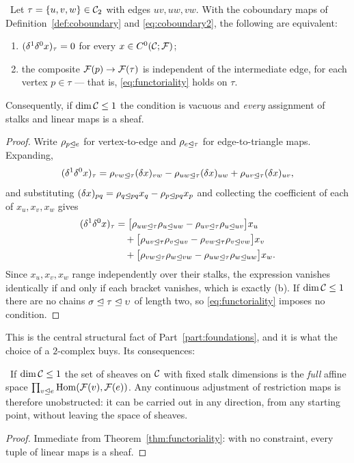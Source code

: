 \begin{theorem}[Functoriality on a triangle is exactly $\cob^1\cob^0=0$]
\label{thm:functoriality}
\Proved\ Let $\tau=\{u,v,w\}\in\mathcal{C}_2$ with edges $uv,uw,vw$. With the
coboundary maps of Definition~\ref{def:coboundary} and
\eqref{eq:coboundary2}, the following are equivalent:
\begin{enumerate}[label=(\alph*)]
  \item $(\delta^1\delta^0x)_\tau=0$ for every $x\in C^{0}(\mathcal{C};\mathcal{F})$;
  \item the composite $\mathcal{F}(p)\to\mathcal{F}(\tau)$ is independent of the
    intermediate edge, for each vertex $p\in\tau$ --- that is,
    \eqref{eq:functoriality} holds on $\tau$.
\end{enumerate}
Consequently, if $\dim\mathcal{C}\le1$ the condition is vacuous and \emph{every}
assignment of stalks and linear maps is a sheaf.
\end{theorem}
\begin{proof}
Write $\rho_{p\trianglelefteq e}$ for vertex-to-edge and $\rho_{e\trianglelefteq\tau}$ for
edge-to-triangle maps. Expanding,
\[
  (\delta^1\delta^0x)_\tau
   = \rho_{vw\trianglelefteq\tau}(\delta x)_{vw}
   - \rho_{uw\trianglelefteq\tau}(\delta x)_{uw}
   + \rho_{uv\trianglelefteq\tau}(\delta x)_{uv},
\]
and substituting $(\delta x)_{pq}=\rho_{q\trianglelefteq pq}x_q-\rho_{p\trianglelefteq pq}x_p$
and collecting the coefficient of each of $x_u,x_v,x_w$ gives
\begin{align*}
  (\delta^1\delta^0x)_\tau
  &= \bigl[\rho_{uw\trianglelefteq\tau}\rho_{u\trianglelefteq uw}
          -\rho_{uv\trianglelefteq\tau}\rho_{u\trianglelefteq uv}\bigr]x_u\\
  &\quad+\bigl[\rho_{uv\trianglelefteq\tau}\rho_{v\trianglelefteq uv}
          -\rho_{vw\trianglelefteq\tau}\rho_{v\trianglelefteq vw}\bigr]x_v\\
  &\quad+\bigl[\rho_{vw\trianglelefteq\tau}\rho_{w\trianglelefteq vw}
          -\rho_{uw\trianglelefteq\tau}\rho_{w\trianglelefteq uw}\bigr]x_w .
\end{align*}
Since $x_u,x_v,x_w$ range independently over their stalks, the expression
vanishes identically if and only if each bracket vanishes, which is exactly
(b). If $\dim\mathcal{C}\le1$ there are no chains $\sigma\trianglelefteq\tau\trianglelefteq\upsilon$
of length two, so \eqref{eq:functoriality} imposes no condition.
\end{proof}

This is the central structural fact of Part~\ref{part:foundations}, and it is
what the choice of a $2$-complex buys. Its consequences:

\begin{corollary}\label{cor:graphvacuous}
\Proved\ If $\dim\mathcal{C}\le1$ the set of sheaves on $\mathcal{C}$ with fixed stalk
dimensions is the \emph{full} affine space
$\prod_{v\trianglelefteq e}\operatorname{Hom}(\mathcal{F}(v),\mathcal{F}(e))$. Any continuous
adjustment of restriction maps is therefore unobstructed: it can be carried
out in any direction, from any starting point, without leaving the space of
sheaves.
\end{corollary}
\begin{proof}
Immediate from Theorem~\ref{thm:functoriality}: with no constraint, every
tuple of linear maps is a sheaf.
\end{proof}

